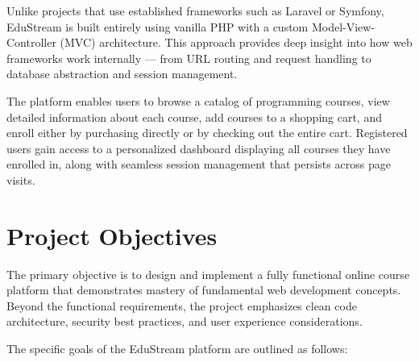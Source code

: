 \documentclass[12pt,a4paper]{report}
\begin{document}
Unlike projects that use established frameworks such as Laravel or Symfony, EduStream is built entirely using vanilla PHP with a custom Model-View-Controller (MVC) architecture. This approach provides deep insight into how web frameworks work internally — from URL routing and request handling to database abstraction and session management.

The platform enables users to browse a catalog of programming courses, view detailed information about each course, add courses to a shopping cart, and enroll either by purchasing directly or by checking out the entire cart. Registered users gain access to a personalized dashboard displaying all courses they have enrolled in, along with seamless session management that persists across page visits.

\section{Project Objectives}

The primary objective is to design and implement a fully functional online course platform that demonstrates mastery of fundamental web development concepts. Beyond the functional requirements, the project emphasizes clean code architecture, security best practices, and user experience considerations.

The specific goals of the EduStream platform are outlined as follows:
\end{document}
